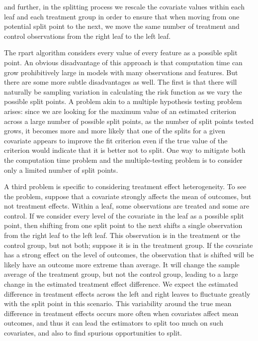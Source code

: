 \documentclass[11pt]{article}
\begin{document}
and further, in the splitting process we rescale the covariate values within each leaf and each treatment group
in order to ensure that when moving
from one potential split point to the next, we move the same number of treatment and control observations from the right leaf to the left leaf.  \par
The rpart algorithm considers every value of every feature as a possible split point.
An obvious disadvantage of this approach is that computation time can grow prohibitively large in models with many observations
and features.  But there are some more subtle disadvantages as well. The first is that there will naturally be sampling variation
in calculating the risk function as we vary the possible split points. A problem akin to a multiple hypothesis testing problem arises:
since we are looking for the maximum value of an estimated criterion across a large number of possible split points,
as the number of split points tested grows, it becomes more and more likely that one of the splits for a given covariate appears to improve the fit criterion even if the true
value of the criterion would indicate that it is better not to split.  One way to mitigate both the computation time problem and
the multiple-testing problem is to consider only a limited number of split points. \par
A third problem is specific to considering treatment effect heterogeneity.  To see the problem, suppose that a covariate
strongly affects the mean of outcomes, but not treatment effects.  Within a leaf, some observations are treated and some
are control. If we consider every level of the covariate in the leaf as a possible split point, then shifting from one split point to the
next shifts a single observation from the right leaf to the left leaf.  This observation is in the treatment or the control group,
but not both; suppose it is in the treatment group.  If the covariate has a strong effect on the level of outcomes, the observation that is shifted will be likely have an
outcome more extreme than average. It will change the sample average of the treatment group, but not the control group, leading
to a large change in the estimated treatment effect difference.
We expect the estimated difference in treatment effects across the left and right leaves to fluctuate greatly with the split point in this scenario.  This
variability around the true mean difference in treatment effects occurs more often when covariates affect mean outcomes, and thus it
can lead the estimators to split too much on such covariates, and also to find spurious opportunities to split.\par
\end{document}
